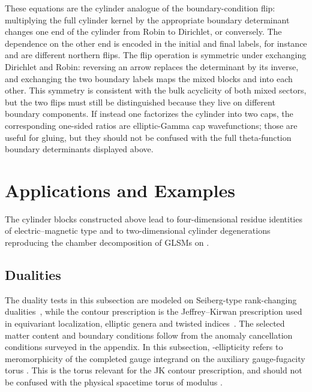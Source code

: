 \documentclass[11pt,a4paper]{article}
\makeatletter
\numberwithin{equation}{section}
\theoremstyle{plain}
\theoremstyle{definition}
\theoremstyle{remark}
\newcommand{\cyl}{\mathsf{Cyl}}
\newcounter{mathrecordid}
\newcommand{\mathboxbegin}[1]{%
  \stepcounter{mathrecordid}%
  \immediate\write\mathrecords{\themathrecordid,#1}%
  \special{pdf:bann << /Type /Annot /Subtype /Link /Border [0 0 0]
    /MathBoxID \themathrecordid /F 2
    /A << /S /URI /URI (urn:mathbox:\themathrecordid) >> >>}}
\newcommand{\mathboxinlineplain}[1]{$#1$}
\newcommand{\mathboxinline}[1]{%
  $\mathboxbegin{inline}#1\special{pdf:eann}$}
\newcommand{\recordmath}{%
  \ifmeasuring@\expandafter\mathboxinlineplain
  \else\expandafter\mathboxinline\fi}
\makeatother
\begin{document}
These equations are the cylinder analogue of the boundary-condition flip: multiplying the full cylinder kernel by the appropriate boundary determinant changes one end of the cylinder from Robin to Dirichlet, or conversely.  The dependence on the other end is encoded in the initial and final labels, for instance \recordmath{RR\to DR} and \recordmath{RD\to DD} are different northern flips.  The flip operation is symmetric under exchanging Dirichlet and Robin: reversing an arrow replaces the determinant by its inverse, and exchanging the two boundary labels maps the mixed blocks \recordmath{z_{\rm DR}} and \recordmath{z_{\rm RD}} into each other.  This symmetry is consistent with the bulk acyclicity of both mixed sectors, but the two flips must still be distinguished because they live on different boundary components.  If instead one factorizes the cylinder into two caps, the corresponding one-sided ratios are elliptic-Gamma cap wavefunctions; those are useful for gluing, but they should not be confused with the full theta-function boundary determinants displayed above.


\section{Applications and Examples}\label{sec:applications-examples}

The cylinder blocks constructed above lead to four-dimensional \recordmath{\cyl\times T^2} residue identities of electric--magnetic type and to two-dimensional cylinder degenerations reproducing the chamber decomposition of GLSMs on \recordmath{\cyl\simeq I\times S^1}.



\subsection{Dualities}\label{sec:duality}

The duality tests in this subsection are modeled on Seiberg-type rank-changing dualities~\cite{Seiberg:1994pq}, while the contour prescription is the Jeffrey--Kirwan prescription used in equivariant localization, elliptic genera and twisted indices~\cite{JeffreyKirwan1995,Benini:2013xpa,Benini:2013nda,Closset:2017zgf}. The selected matter content and boundary conditions follow from the anomaly cancellation conditions surveyed in the appendix. In this subsection, \recordmath{\omega}-ellipticity refers to meromorphicity of the completed gauge integrand on the auxiliary gauge-fugacity torus \recordmath{u\sim u+1\sim u+\omega}. This is the torus relevant for the JK contour prescription, and should not be confused with the physical spacetime torus of modulus \recordmath{\tau}.
\end{document}
